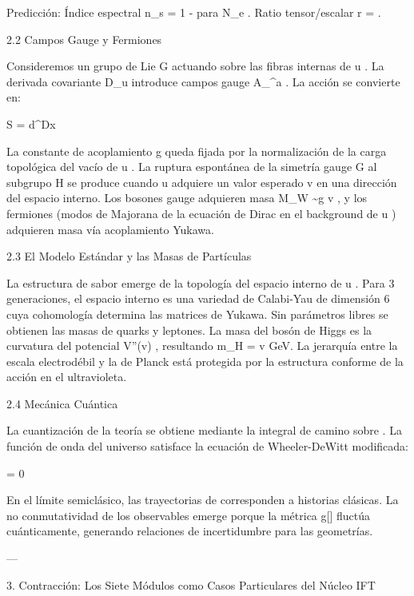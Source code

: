 \documentclass[12pt,twoside]{book}
\begin{document}
Predicción: Índice espectral  n_s = 1 -    para  N_e  . Ratio tensor/escalar  r =   .

2.2 Campos Gauge y Fermiones

Consideremos un grupo de Lie  G  actuando sobre las fibras internas de  u . La derivada covariante  D_\mu u  introduce campos gauge  A_\mu^a . La acción se convierte en:

S = \int d^Dx  

La constante de acoplamiento  g  queda fijada por la normalización de la carga topológica del vacío de  u . La ruptura espontánea de la simetría gauge  G  al subgrupo  H  se produce cuando  u  adquiere un valor esperado  v  en una dirección del espacio interno. Los bosones gauge adquieren masa  M_W \sim g v , y los fermiones (modos de Majorana de la ecuación de Dirac en el background de  u ) adquieren masa vía acoplamiento Yukawa.

2.3 El Modelo Estándar y las Masas de Partículas

La estructura de sabor emerge de la topología del espacio interno de  u . Para 3 generaciones, el espacio interno es una variedad de Calabi-Yau de dimensión 6 cuya cohomología determina las matrices de Yukawa. Sin parámetros libres se obtienen las masas de quarks y leptones. La masa del bosón de Higgs es la curvatura del potencial  V''(v) , resultando  m_H = \sqrt{2\lambda}v   GeV. La jerarquía entre la escala electrodébil y la de Planck está protegida por la estructura conforme de la acción en el ultravioleta.

2.4 Mecánica Cuántica

La cuantización de la teoría se obtiene mediante la integral de camino sobre  \rho . La función de onda del universo  \Psi[\rho]  satisface la ecuación de Wheeler-DeWitt modificada:

 \Psi[\rho] = 0

En el límite semiclásico, las trayectorias de  \rho  corresponden a historias clásicas. La no conmutatividad de los observables emerge porque la métrica  g[\rho]  fluctúa cuánticamente, generando relaciones de incertidumbre para las geometrías.

---

3. Contracción: Los Siete Módulos como Casos Particulares del Núcleo IFT
\end{document}
